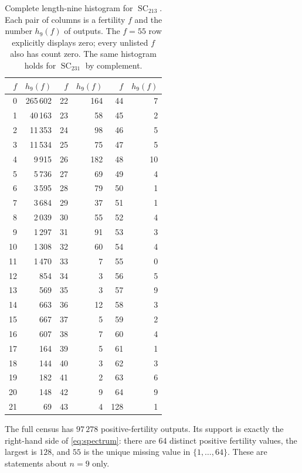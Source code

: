 \documentclass[11pt,a4paper]{article}
\newcommand{\SC}{\operatorname{SC}}
\begin{document}
\begin{table}[p]
\centering
\caption{Complete length-nine histogram for $\SC_{213}$. Each pair of
columns is a fertility $f$ and the number $h_9(f)$ of outputs. The
$f=55$ row explicitly displays zero; every unlisted $f$ also has count
zero. The same histogram holds for $\SC_{231}$ by complement.}
\label{tab:histogram}
\medskip
\begin{tabular}{rr@{\qquad}rr@{\qquad}rr}
\toprule
$f$&$h_9(f)$&$f$&$h_9(f)$&$f$&$h_9(f)$\\
\midrule
0 & 265\,602 & 22 & 164 & 44 & 7 \\
1 & 40\,163 & 23 & 58 & 45 & 2 \\
2 & 11\,353 & 24 & 98 & 46 & 5 \\
3 & 11\,534 & 25 & 75 & 47 & 5 \\
4 & 9\,915 & 26 & 182 & 48 & 10 \\
5 & 5\,736 & 27 & 69 & 49 & 4 \\
6 & 3\,595 & 28 & 79 & 50 & 1 \\
7 & 3\,684 & 29 & 37 & 51 & 1 \\
8 & 2\,039 & 30 & 55 & 52 & 4 \\
9 & 1\,297 & 31 & 91 & 53 & 3 \\
10 & 1\,308 & 32 & 60 & 54 & 4 \\
11 & 1\,470 & 33 & 7 & 55 & 0 \\
12 & 854 & 34 & 3 & 56 & 5 \\
13 & 569 & 35 & 3 & 57 & 9 \\
14 & 663 & 36 & 12 & 58 & 3 \\
15 & 667 & 37 & 5 & 59 & 2 \\
16 & 607 & 38 & 7 & 60 & 4 \\
17 & 164 & 39 & 5 & 61 & 1 \\
18 & 144 & 40 & 3 & 62 & 3 \\
19 & 182 & 41 & 2 & 63 & 6 \\
20 & 148 & 42 & 9 & 64 & 9 \\
21 & 69 & 43 & 4 & 128 & 1 \\
\bottomrule
\end{tabular}
\end{table}

The full census has $97\,278$ positive-fertility outputs. Its support
is exactly the right-hand side of \eqref{eq:spectrum}: there are
64 distinct positive fertility values, the largest is $128$, and $55$ is
the unique missing value in $\{1,\ldots,64\}$. These are statements
about $n=9$ only.
\end{document}
